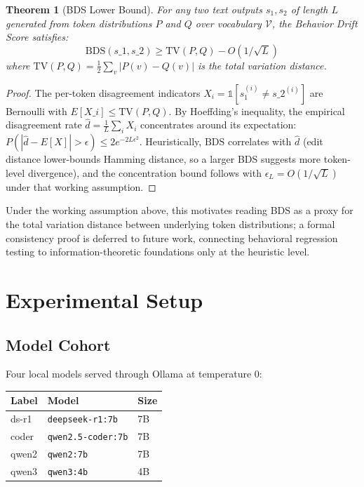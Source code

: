 \documentclass[11pt]{article}
\newtheorem{theorem}{Theorem}
\begin{document}
\begin{theorem}[BDS Lower Bound]
\label{thm:bds-bound}
For any two text outputs $s_1, s_2$ of length $L$ generated from token
distributions $P$ and $Q$ over vocabulary $\mathcal{V}$, the Behavior
Drift Score satisfies:
\begin{equation}
\mathrm{BDS}(s\_1, s\_2) \geq \mathrm{TV}(P, Q) - O(1/\sqrt{L})
\end{equation}
where $\mathrm{TV}(P, Q) = \frac{1}{2}\sum_{v} |P(v) - Q(v)|$ is the
total variation distance.
\end{theorem}

\begin{proof}
The per-token disagreement indicators $X_i = \mathbb{1}[s_1^{(i)} \neq
s\_2^{(i)}]$ are Bernoulli with $E[X\_i] \leq \mathrm{TV}(P, Q)$. By
Hoeffding's inequality, the empirical disagreement rate
$\hat{d} = \frac{1}{L}\sum_i X_i$ concentrates around its expectation:
$P(|\hat{d} - E[X]| > \epsilon) \leq 2e^{-2L\epsilon^2}$. Heuristically,
$\mathrm{BDS}$ correlates with $\hat{d}$ (edit distance lower-bounds Hamming
distance, so a larger BDS suggests more token-level divergence), and the
concentration bound follows with $\epsilon_L = O(1/\sqrt{L})$ under that
working assumption.
\end{proof}

Under the working assumption above, this motivates reading BDS as a
proxy for the total variation distance between underlying token
distributions; a formal consistency proof is deferred to future work,
connecting behavioral regression testing to information-theoretic
foundations only at the heuristic level.

\section{Experimental Setup}
\label{sec:setup}

\subsection{Model Cohort}

Four local models served through Ollama at temperature 0:

\begin{center}
\begin{tabular}{@{}lll@{}}
\toprule
Label & Model & Size \\
\midrule
ds-r1  & \texttt{deepseek-r1:7b}  & 7B \\
coder  & \texttt{qwen2.5-coder:7b} & 7B \\
qwen2  & \texttt{qwen2:7b}        & 7B \\
qwen3  & \texttt{qwen3:4b}        & 4B \\
\bottomrule
\end{tabular}
\end{center}
\end{document}
